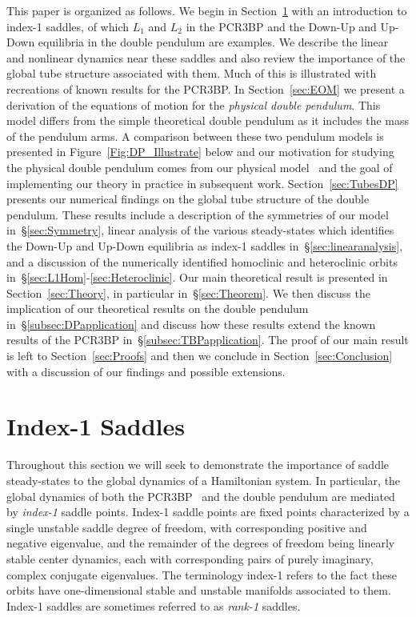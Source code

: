 \documentclass[11pt]{article}
\numberwithin{equation}{section}
\theoremstyle{plain}
\begin{document}
This paper is organized as follows. We begin in Section~\ref{sec:Background} with an introduction to index-1 saddles, of which $L_1$ and $L_2$ in the PCR3BP and the Down-Up and Up-Down equilibria in the double pendulum are examples. We describe the linear and nonlinear dynamics near these saddles and also review the importance of the global tube structure associated with them. Much of this is illustrated with recreations of known results for the PCR3BP. In Section~\ref{sec:EOM} we present a derivation of the equations of motion for the {\em physical double pendulum}. This model differs from the simple theoretical double pendulum as it includes the mass of the pendulum arms. A comparison between these two pendulum models is presented in Figure~\ref{Fig:DP_Illustrate} below and our motivation for studying the physical double pendulum comes from our physical model~\cite{kaheman2022experimental} and the goal of implementing our theory in practice in subsequent work. Section~\ref{sec:TubesDP} presents our numerical findings on the global tube structure of the double pendulum. These results include a description of the symmetries of our model in~\S\ref{sec:Symmetry}, linear analysis of the various steady-states which identifies the Down-Up and Up-Down equilibria as index-1 saddles in~\S\ref{sec:linearanalysis}, and a discussion of the numerically identified homoclinic and heteroclinic orbits in~\S\ref{sec:L1Hom}-\ref{sec:Heteroclinic}. Our main theoretical result is presented in Section~\ref{sec:Theory}, in particular in~\S\ref{sec:Theorem}. We then discuss the implication of our theoretical results on the double pendulum in~\S\ref{subsec:DPapplication} and discuss how these results extend the known results of the PCR3BP in~\S\ref{subsec:TBPapplication}. The proof of our main result is left to Section~\ref{sec:Proofs} and then we conclude in Section~\ref{sec:Conclusion} with a discussion of our findings and possible extensions.

\section{Index-1 Saddles}\label{sec:Background} 

Throughout this section we will seek to demonstrate the importance of saddle steady-states to the global dynamics of a Hamiltonian system.  In particular, the global dynamics of both the PCR3BP~\cite{RossBook,Koon} and the double pendulum are mediated by {\em index-1} saddle points. 
Index-1 saddle points are fixed points characterized by a single unstable saddle degree of freedom, with corresponding positive and negative eigenvalue, and the remainder of the degrees of freedom being linearly stable center dynamics, each with corresponding pairs of purely imaginary, complex conjugate eigenvalues.  
The terminology index-1 refers to the fact these orbits have one-dimensional stable and unstable manifolds associated to them.
Index-1 saddles are sometimes referred to as \emph{rank-1} saddles.  
\end{document}
